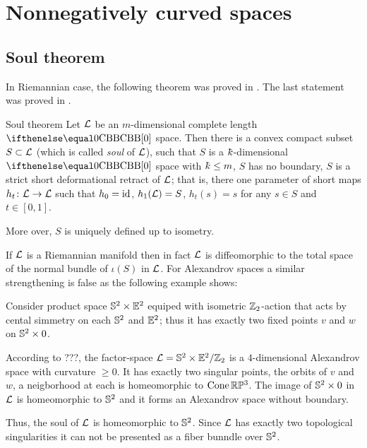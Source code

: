 \chapter{Nonnegatively curved spaces}


\section{Soul theorem}

In Riemannian case, the following theorem was proved in \cite{cheeger-gromoll-soul}.
The last statement was proved in \cite{sharafutdinov}.

\begin{thm}{Soul theorem}
Let $\mathcal{L}$ be an $m$-dimensional complete length $\Alex0$ space. 
Then there is a convex compact subset $S\subset \spc{L}$ (which is called \emph{soul} of $\mathcal{L}$), such that  $S$ is a $\kay$-dimensional $\Alex{0}$ space with $\kay\le m$,
$S$ has no boundary,
$S$ is a strict short deformational retract of $\mathcal{L}$; that is, there one parameter of short maps $h_t\:\spc{L}\to \spc{L}$ such that $h_0=\mathop{\rm id}\nolimits$, $h_1(\mathcal{L})=S$, $h_t(s)=s$ for any $s\in S$ and $t\in[0,1]$.

More over, $S$ is uniquely defined up to isometry.
\end{thm}

If $\mathcal{L}$ is a Riemannian manifold then in fact
$\mathcal{L}$ is diffeomorphic to the total space of the normal bundle of $\iota(S)$ in $\mathcal{L}$. 
For Alexandrov spaces a similar strengthening is false as the following example shows:

 Consider product space $\SS^2\times \EE^2$ equiped with isometric $\mathbb{Z}_2$-action that acts by cental simmetry on each $\mathbb{S}^2$ and $\mathbb{E}^2$; thus it has exactly two fixed points $v$ and $w$ on $\SS^2\times 0$.

According to ???,
the factor-space $\spc{L}=\SS^2\times \EE^2/\ZZ_2$ is a $4$-dimensional Alexandrov space with curvature $\ge 0$.
It has exactly two singular points, the orbits of $v$ and $w$, a neigborhood at each is homeomorphic to $\mathop{\rm Cone}\nolimits\mathbb{R}\mathbb{P}^3$.
The image of $\SS^2\times 0$ in $\mathcal{L}$ is homeomorphic to $\mathbb{S}^2$ and it forms an Alexandrov space without boundary.

Thus, the soul of $\mathcal{L}$ is homeomorphic to $\mathbb{S}^2$. 
Since $\mathcal{L}$ has exactly two topological singularities it can not be presented as a fiber bunndle over $\mathbb{S}^2$. 

\smallskip

